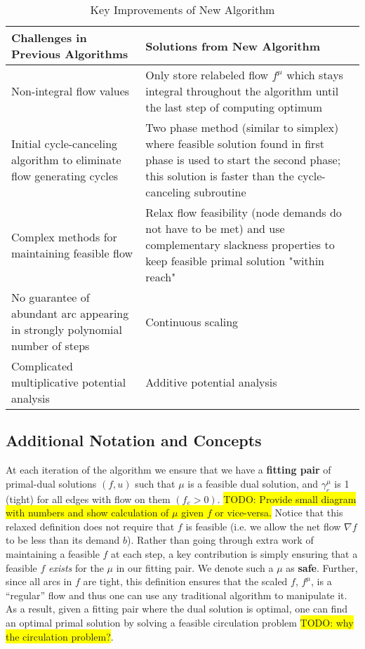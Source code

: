 \documentclass{article}
\newcommand{\todo}[1]{\colorbox{yellow}{TODO: #1}}
\begin{document}
\begin{table}[H]
\begin{center}
    \begin{tabular}{ | p{7cm} | p{7cm} |}
    \hline
    Challenges in Previous Algorithms  & Solutions from New Algorithm \\ \hline
    Non-integral flow values & Only store relabeled flow $f^{\mu}$ which stays integral throughout the algorithm until the last step of computing optimum \\ \hline
    Initial cycle-canceling algorithm to eliminate flow generating cycles & Two phase method (similar to simplex) where feasible solution found in first phase is used to start the second phase; this solution is faster than the cycle-canceling subroutine \\ \hline
    Complex methods for maintaining feasible flow & Relax flow feasibility (node demands do not have to be met) and use complementary slackness properties to keep feasible primal solution "within reach" \\ \hline
    No guarantee of abundant arc appearing in strongly polynomial number of steps \cite{Radzik2004} &  Continuous scaling\\ \hline
    Complicated multiplicative potential analysis \cite{Vegh2013} & Additive potential analysis \\
    \hline
    \end{tabular}
\end{center}
\caption{Key Improvements of New Algorithm}
\label{tab:improvements}
\end{table}
    \subsection{Additional Notation and Concepts}
At each iteration of the algorithm we ensure that we have a \textbf{fitting pair} of primal-dual solutions $(f,u)$ such that $\mu$ is a feasible dual solution, and $\gamma_e^{\mu}$ is 1 (tight) for all edges with flow on them $(f_e > 0)$. \todo{Provide small diagram with numbers and show calculation of $\mu$ given $f$ or vice-versa.} Notice that this relaxed definition does not require that $f$ is feasible (i.e. we allow the net flow $\nabla f $ to be less than its demand $b$). Rather than going through extra work of maintaining a feasible $f$ at each step, a key contribution is simply ensuring that a feasible $f$ \textit{exists} for the $\mu$ in our fitting pair. We denote such a $\mu$ as \textbf{safe}. Further, since all arcs in $f$ are tight, this definition ensures that the scaled $f$, $f^{\mu}$, is a ``regular'' flow and thus one can use any traditional algorithm to manipulate it. As a result, given a fitting pair where the dual solution is optimal, one can find an optimal primal solution by solving a feasible circulation problem \todo{why the circulation problem?}. 
\end{document}
